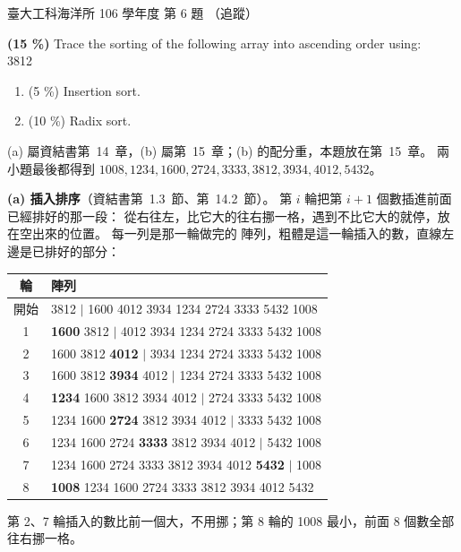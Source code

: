 \begin{pastexam}[label={px:ntu-106-esoe-ds-06}]{臺大工科海洋所 106 學年度 第 6 題}
（追蹤）

\textbf{(15 \%)} Trace the sorting of the following array into ascending order using:\\
3812
\begin{enumerate}[label=\alph*.]
\item (5 \%) Insertion sort.
\item (10 \%) Radix sort.
\end{enumerate}
\end{pastexam}

\begin{pastsoln}
(a) 屬資結書第~14~章，(b) 屬第~15~章；(b) 的配分重，本題放在第~15~章。 兩小題最後都得到
$1008, 1234, 1600, 2724, 3333, 3812, 3934, 4012, 5432$。

\textbf{(a) 插入排序}（資結書第~1.3~節、第~14.2~節）。 第 $i$ 輪把第 $i + 1$ 個數插進前面已經排好的那一段：
從右往左，比它大的往右挪一格，遇到不比它大的就停，放在空出來的位置。 每一列是那一輪做完的
陣列，粗體是這一輪插入的數，直線左邊是已排好的部分：
\begin{center}
\small
\begin{tabular}{cl}
\toprule
輪 & 陣列 \\
\midrule
開始 & 3812 $|$ 1600 4012 3934 1234 2724 3333 5432 1008 \\
1 & \textbf{1600} 3812 $|$ 4012 3934 1234 2724 3333 5432 1008 \\
2 & 1600 3812 \textbf{4012} $|$ 3934 1234 2724 3333 5432 1008 \\
3 & 1600 3812 \textbf{3934} 4012 $|$ 1234 2724 3333 5432 1008 \\
4 & \textbf{1234} 1600 3812 3934 4012 $|$ 2724 3333 5432 1008 \\
5 & 1234 1600 \textbf{2724} 3812 3934 4012 $|$ 3333 5432 1008 \\
6 & 1234 1600 2724 \textbf{3333} 3812 3934 4012 $|$ 5432 1008 \\
7 & 1234 1600 2724 3333 3812 3934 4012 \textbf{5432} $|$ 1008 \\
8 & \textbf{1008} 1234 1600 2724 3333 3812 3934 4012 5432 \\
\bottomrule
\end{tabular}
\end{center}
第 2、7 輪插入的數比前一個大，不用挪；第 8 輪的 1008 最小，前面 $8$ 個數全部往右挪一格。


\end{pastsoln}
